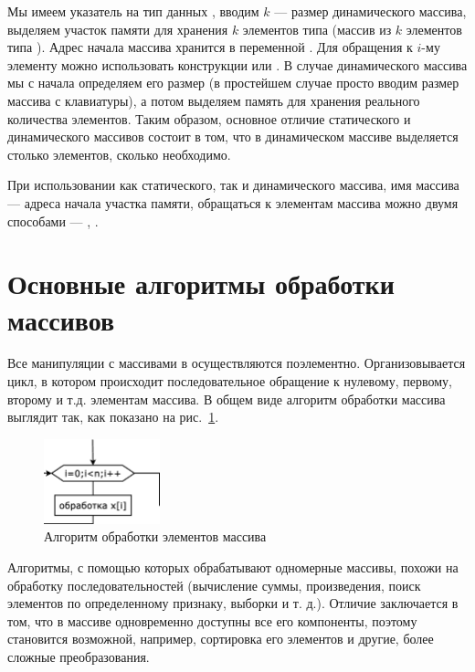 Мы имеем указатель на тип данных , вводим $k$ --- размер динамического массива, выделяем
участок памяти для хранения $k$ элементов типа  (массив из
$k$  элементов типа ). Адрес начала массива хранится в переменной
. Для обращения к $i$-му элементу можно использовать конструкции  или
. В случае динамического массива мы с начала определяем его размер (в простейшем случае просто
вводим размер массива с клавиатуры), а потом выделяем память для хранения реального количества элементов. Таким образом,
основное отличие статического и динамического массивов состоит в том, что в динамическом массиве выделяется столько
элементов, сколько необходимо.

При использовании как статического, так и динамического массива, имя массива --- адреса начала участка
памяти, обращаться к элементам массива можно двумя способами --- , .

\section[Основные алгоритмы обработки массивов]{Основные алгоритмы обработки массивов}
Все манипуляции с массивами в  осуществляются поэлементно. Организовывается цикл, в котором происходит
последовательное обращение к нулевому, первому, второму и т.д. элементам массива. В общем виде алгоритм обработки
массива выглядит так, как показано на рис.~\ref{ch05:refDrawing0}.

\begin{figure}[htb]
\begin{center}
\includegraphics[width=0.3\textwidth]{img/ris_5_1}
\caption{Алгоритм обработки элементов массива}
\label{ch05:refDrawing0}
\end{center}
\end{figure}

Алгоритмы, с помощью которых обрабатывают одномерные массивы, похожи на обработку последовательностей (вычисление суммы,
произведения, поиск элементов по определенному признаку, выборки и т. д.). Отличие заключается в том, что в массиве
одновременно доступны все его компоненты, поэтому становится возможной, например, сортировка его элементов и другие,
более сложные преобразования.

